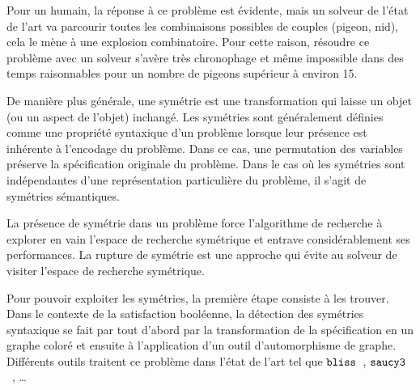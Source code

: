  
Pour un humain, la réponse à ce problème est évidente, mais un solveur de l'état de l'art va parcourir toutes 
les combinaisons possibles de couples (pigeon, nid), cela le mène à une explosion combinatoire.
Pour cette raison, résoudre ce problème avec un solveur s'avère très chronophage et même impossible dans des temps raisonnables
pour un nombre de pigeons supérieur à environ 15.

%
%

De manière plus  générale, une symétrie est une transformation qui laisse un objet (ou un aspect de l'objet) inchangé. Les symétries sont généralement définies comme une propriété syntaxique d'un problème lorsque leur présence est inhérente à l'encodage du problème.
Dans ce cas, une permutation des variables préserve la spécification originale du problème.
Dans le cas où les symétries sont indépendantes d'une représentation particulière du problème, il s'agit de symétries sémantiques.

La présence de symétrie dans un problème force l'algorithme de recherche à explorer en vain l'espace de recherche symétrique et entrave considérablement ses performances. La rupture de symétrie est une approche qui évite au solveur de visiter l'espace de recherche symétrique.

Pour pouvoir exploiter les symétries, la première étape consiste à les trouver. Dans le contexte de la satisfaction booléenne, la détection des symétries syntaxique se fait par tout d'abord par la transformation de la spécification en un graphe coloré et ensuite à l'application d'un outil d'automorphisme de graphe.
Différents outils traitent ce problème dans l'état de l'art tel que $\texttt{bliss}$~\cite{JunttilaKaski:ALENEX2007}, $\texttt{saucy3}$~\cite{katebi2010symmetry}, …


